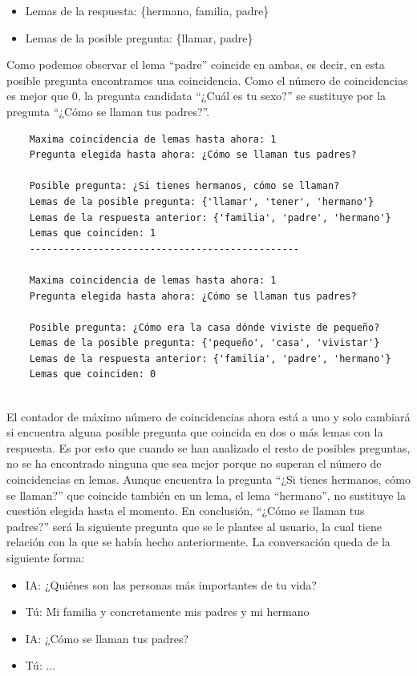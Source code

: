 \begin{itemize}
	\item[] Lemas de la respuesta: \hspace{2cm} \{hermano, familia, padre\} 
	\item[] Lemas de la posible pregunta: \hspace{0.8cm} \{llamar, padre\}
\end{itemize}

Como podemos observar el lema ``padre'' coincide en ambas, es decir, en esta posible pregunta encontramos una coincidencia. Como el número de coincidencias es mejor que 0, la pregunta candidata ``¿Cuál es tu sexo?'' se sustituye por la pregunta ``¿Cómo se llaman tus padres?''. 

\begin{verbatim}
	Maxima coincidencia de lemas hasta ahora: 1
	Pregunta elegida hasta ahora: ¿Cómo se llaman tus padres?
	
	Posible pregunta: ¿Si tienes hermanos, cómo se llaman?
	Lemas de la posible pregunta: {'llamar', 'tener', 'hermano'}
	Lemas de la respuesta anterior: {'familia', 'padre', 'hermano'}
	Lemas que coinciden: 1
	-----------------------------------------------
	
	Maxima coincidencia de lemas hasta ahora: 1
	Pregunta elegida hasta ahora: ¿Cómo se llaman tus padres?
	
	Posible pregunta: ¿Cómo era la casa dónde viviste de pequeño?
	Lemas de la posible pregunta: {'pequeño', 'casa', 'vivistar'}
	Lemas de la respuesta anterior: {'familia', 'padre', 'hermano'}
	Lemas que coinciden: 0
	
\end{verbatim}

El contador de máximo número de coincidencias ahora está a uno y solo cambiará si encuentra alguna posible pregunta que coincida en dos o más lemas con la respuesta. Es por esto que cuando se han analizado el resto de posibles preguntas, no se ha encontrado ninguna que sea mejor porque no superan el número de coincidencias en lemas. Aunque encuentra la pregunta ``¿Si tienes hermanos, cómo se llaman?'' que coincide también en un lema, el lema ``hermano'', no sustituye la cuestión elegida hasta el momento. En conclusión, ``¿Cómo se llaman tus padres?'' será la siguiente pregunta que se le plantee al usuario, la cual tiene relación con la que se había hecho anteriormente. La conversación queda de la siguiente forma:

\begin{itemize}
	\item[] IA: ¿Quiénes son las personas más importantes de tu vida?
	\item[] Tú: Mi familia y concretamente mis padres y mi hermano
	\item[] IA: ¿Cómo se llaman tus padres?
	\item[] Tú: ...
\end{itemize}

